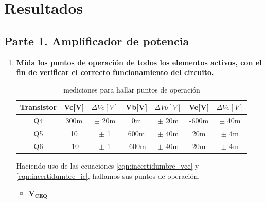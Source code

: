 
\section{Resultados}\label{sec:resultados}
\subsection{Parte 1. Amplificador de potencia} \label{subsec:parte1}

\begin{enumerate}
  \item \textbf{Mida los puntos de operación de todos los elementos activos, con el fin de verificar el correcto funcionamiento del circuito.}

        \begin{table}[H]
          \centering
          \begin{tabular}{|c|c|c|c|c|c|c|}
            \hline
            \textbf{Transistor} & \textbf{Vc[V]} & \textbf{$\Delta Vc[V]$} & \textbf{Vb[V]} & \textbf{$\Delta Vb[V]$} & \textbf{Ve[V]} & \textbf{$\Delta Ve[V]$} \\
            \hline
            Q4                  & 300m           & $\pm$ 20m               & 0m             & $\pm$ 20m               & -600m          & $\pm$ 40m               \\
            Q5                  & 10             & $\pm$ 1                 & 600m           & $\pm$ 40m               & 20m            & $\pm$ 4m                \\
            Q6                  & -10            & $\pm$ 1                 & -600m          & $\pm$ 40m               & 20m            & $\pm$ 4m                \\
            \hline
          \end{tabular}
          \caption{mediciones para hallar puntos de operación}
          \label{tab:pto_oper1}
        \end{table}

        Haciendo uso de las ecuaciones \ref{eqn:incertidumbre_vce} y \ref{eqn:incertidumbre_ic}, hallamos sus puntos de operación.

        \begin{itemize}
          \item $\mathbf{V_{CEQ}}$


\end{itemize}
\end{enumerate}

